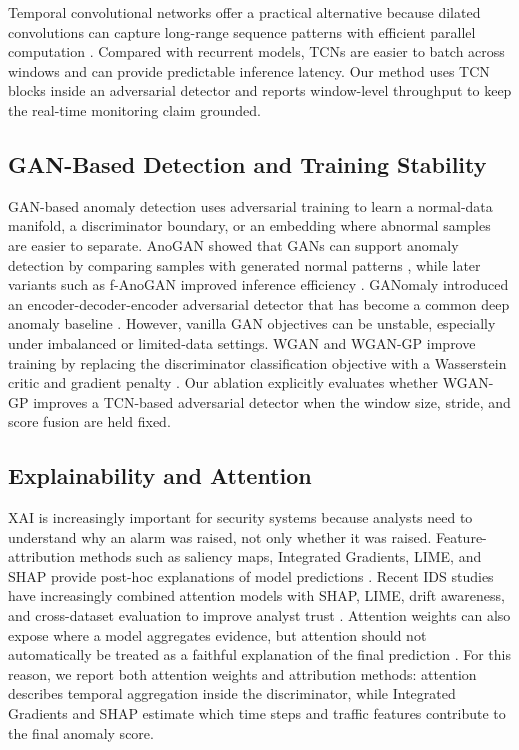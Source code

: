 \documentclass[conference]{IEEEtran}
\begin{document}
Temporal convolutional networks offer a practical alternative because dilated convolutions can capture long-range sequence patterns with efficient parallel computation \cite{bai2018tcn}. Compared with recurrent models, TCNs are easier to batch across windows and can provide predictable inference latency. Our method uses TCN blocks inside an adversarial detector and reports window-level throughput to keep the real-time monitoring claim grounded.

\subsection{GAN-Based Detection and Training Stability}
GAN-based anomaly detection uses adversarial training to learn a normal-data manifold, a discriminator boundary, or an embedding where abnormal samples are easier to separate. AnoGAN showed that GANs can support anomaly detection by comparing samples with generated normal patterns \cite{schlegl2017anogan}, while later variants such as f-AnoGAN improved inference efficiency \cite{schlegl2019fanogan}. GANomaly introduced an encoder-decoder-encoder adversarial detector that has become a common deep anomaly baseline \cite{akcay2018ganomaly}. However, vanilla GAN objectives can be unstable, especially under imbalanced or limited-data settings. WGAN and WGAN-GP improve training by replacing the discriminator classification objective with a Wasserstein critic and gradient penalty \cite{arjovsky2017wgan,gulrajani2017wgangp}. Our ablation explicitly evaluates whether WGAN-GP improves a TCN-based adversarial detector when the window size, stride, and score fusion are held fixed.

\subsection{Explainability and Attention}
XAI is increasingly important for security systems because analysts need to understand why an alarm was raised, not only whether it was raised. Feature-attribution methods such as saliency maps, Integrated Gradients, LIME, and SHAP provide post-hoc explanations of model predictions \cite{simonyan2014saliency,sundararajan2017axiomatic,ribeiro2016lime,lundberg2017shap}. Recent IDS studies have increasingly combined attention models with SHAP, LIME, drift awareness, and cross-dataset evaluation to improve analyst trust \cite{rahman2025explaining,sehgal2026adaptive}. Attention weights can also expose where a model aggregates evidence, but attention should not automatically be treated as a faithful explanation of the final prediction \cite{jain2019attention}. For this reason, we report both attention weights and attribution methods: attention describes temporal aggregation inside the discriminator, while Integrated Gradients and SHAP estimate which time steps and traffic features contribute to the final anomaly score.
\end{document}
